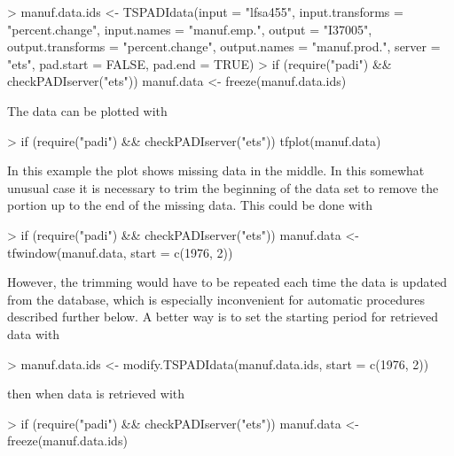\documentclass[english]{article}
\begin{document}
\begin{Schunk}
\begin{Sinput}
> manuf.data.ids <- TSPADIdata(input = "lfsa455", input.transforms = "percent.change", 
      input.names = "manuf.emp.", output = "I37005", output.transforms = "percent.change", 
      output.names = "manuf.prod.", server = "ets", pad.start = FALSE, 
      pad.end = TRUE)
> if (require("padi") && checkPADIserver("ets")) manuf.data <- freeze(manuf.data.ids)
\end{Sinput}
\end{Schunk}

The data can be plotted with

\begin{Schunk}
\begin{Sinput}
> if (require("padi") && checkPADIserver("ets")) tfplot(manuf.data)
\end{Sinput}
\end{Schunk}

In this example the plot shows missing data in the middle. In this
somewhat unusual case it is necessary to trim the beginning of the
data set to remove the portion up to the end of the missing data.
This could be done with

\begin{Schunk}
\begin{Sinput}
> if (require("padi") && checkPADIserver("ets")) manuf.data <- tfwindow(manuf.data, 
      start = c(1976, 2))
\end{Sinput}
\end{Schunk}

However, the trimming would have to be repeated each time the data
is updated from the database, which is especially inconvenient for
automatic procedures described further below. A better way is to set
the starting period for retrieved data with

\begin{Schunk}
\begin{Sinput}
> manuf.data.ids <- modify.TSPADIdata(manuf.data.ids, start = c(1976, 
      2))
\end{Sinput}
\end{Schunk}

then when data is retrieved with

\begin{Schunk}
\begin{Sinput}
> if (require("padi") && checkPADIserver("ets")) manuf.data <- freeze(manuf.data.ids)
\end{Sinput}
\end{Schunk}
\end{document}
